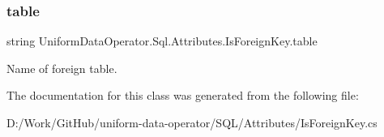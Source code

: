 \subsubsection{\texorpdfstring{table}{table}}
{\footnotesize\ttfamily string Uniform\+Data\+Operator.\+Sql.\+Attributes.\+Is\+Foreign\+Key.\+table}



Name of foreign table. 



The documentation for this class was generated from the following file\+:\begin{DoxyCompactItemize}
\item 
D\+:/\+Work/\+Git\+Hub/uniform-\/data-\/operator/\+S\+Q\+L/\+Attributes/Is\+Foreign\+Key.\+cs\end{DoxyCompactItemize}
